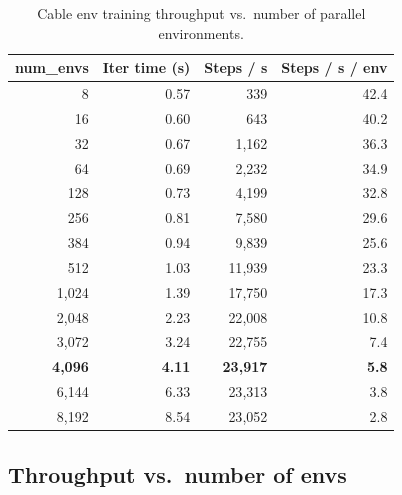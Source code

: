 \documentclass[11pt,a4paper]{article}
\begin{document}
\begin{table}[H]
\centering
\caption*{\sffamily\small\color{nvgrey}Cable env training throughput vs.\ number of parallel environments.}
\begin{tabular}{r r r r}
\toprule
\textbf{num\_envs} & \textbf{Iter time (s)} & \textbf{Steps / s} & \textbf{Steps / s / env}\\
\midrule
8     & 0.57 &    339 & 42.4 \\
16    & 0.60 &    643 & 40.2 \\
32    & 0.67 &  1{,}162 & 36.3 \\
64    & 0.69 &  2{,}232 & 34.9 \\
128   & 0.73 &  4{,}199 & 32.8 \\
256   & 0.81 &  7{,}580 & 29.6 \\
384   & 0.94 &  9{,}839 & 25.6 \\
512   & 1.03 & 11{,}939 & 23.3 \\
1{,}024  & 1.39 & 17{,}750 & 17.3 \\
2{,}048  & 2.23 & 22{,}008 & 10.8 \\
3{,}072  & 3.24 & 22{,}755 &  7.4 \\
\rowcolor{nvlight}\textbf{4{,}096}  & \textbf{4.11} & \textbf{23{,}917} & \textbf{5.8} \\
6{,}144  & 6.33 & 23{,}313 &  3.8 \\
8{,}192  & 8.54 & 23{,}052 &  2.8 \\
\bottomrule
\end{tabular}
\end{table}

\subsection{Throughput vs.\ number of envs}
\end{document}
